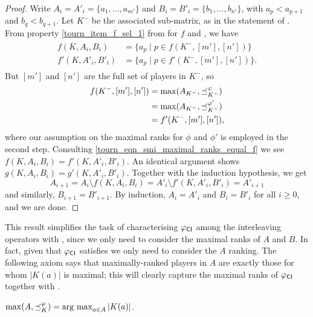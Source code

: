 \begin{proof}
    Write $A_i = A'_i = \{a_1, \ldots, a_{m'}\}$ and $B_i = B'_i =
    \{b_1, \ldots, b_{n'}\}$, with $a_p < a_{p+1}$ and $b_q < b_{q+1}$. Let
    $K^-$ be the associated sub-matrix, as in the statement of \smi{}.
    From property \cref{tourn_item_f_sel_1} from
     for $f$ and \smi{}, we have
    \begin{align}
        \label{tourn_eqn_smi_maximal_ranks_equal_f}
        \begin{split}
            f(K, A_i, B_i) &= \{a_p \mid p \in f(K^-, [m'], [n'])\} \\
            f'(K, A'_i, B'_i) &= \{a_p \mid p \in f'(K^-, [m'], [n'])\}.
        \end{split}
    \end{align}
    But $[m']$ and $[n']$ are the full set of players in $K^-$, so
    \begin{align*}
        f(K^-, [m'], [n'])
        &= \max(A_{K^-}, {\preceq_{K^-}^\varphi}) \\
        &= \max(A_{K^-}, {\preceq_{K^-}^{\varphi'}}) \\
        &= f'(K^-, [m'], [n']),
    \end{align*}
    where our assumption on the maximal ranks for $\phi$ and $\phi'$ is
    employed in the second step. Consulting
    \cref{tourn_eqn_smi_maximal_ranks_equal_f} we see $f(K, A_i, B_i) =
    f'(K, A'_i, B'_i)$. An identical argument shows $g(K, A_i, B_i) = g'(K,
    A'_i, B'_i)$. Together with the induction hypothesis, we get
    \[
        A_{i + 1}
        = A_i \setminus f(K, A_i, B_i)
        = A'_i \setminus f'(K, A'_i, B'_i)
        = A'_{i + 1}
    \]
    and similarly, $B_{i + 1} = B'_{i + 1}$. By induction, $A_i = A'_i$ and
    $B_i = B'_i$ for all $i \ge 0$, and we are done.
\end{proof}

This result simplifies the task of characterising ${\varphi_{\mathsf{CI}}}$ among the
interleaving operators with \smi{}, since we only need to consider the
maximal ranks of $A$ and $B$. In fact, given that ${\varphi_{\mathsf{CI}}}$ satisfies
\dualaxiom{} we only need to consider the $A$ ranking. The following axiom
says that maximally-ranked players in $A$ are exactly those for whom $|K(a)|$
is maximal; this will clearly capture the maximal ranks of ${\varphi_{\mathsf{CI}}}$
together with \dualaxiom{}.

\begin{axiom}[\argmaxaxiom{}]
    $\max(A, {\preceq_K^\varphi}) = \operatorname*{arg\ max}_{a \in A}{|K(a)|}$.
\end{axiom}

